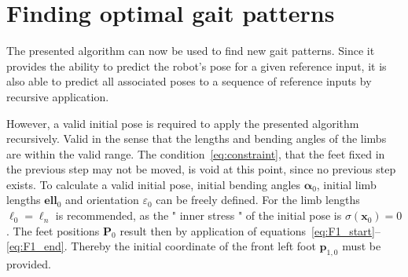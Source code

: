 \documentclass[10pt,a4paper]{article}
\begin{document}
\section{Finding optimal gait patterns}

%

The presented algorithm can now be used to find new gait patterns.
Since it provides the ability to predict the robot's pose for a given reference input, it is also able to predict all associated poses to a sequence of reference inputs by recursive application.


However, a valid initial pose is required to apply the presented algorithm recursively.
Valid in the sense that the lengths and bending angles of the limbs are within the valid range.
The condition~\eqref{eq:constraint}, that the feet fixed in the previous step may not be moved, is void at this point, since no previous step exists.
To calculate a valid initial pose, initial bending angles $\bm{\alpha}_0$, initial limb lengths $\bm{ell}_0$ and orientation $\varepsilon_0$ can be freely defined.
For the limb lengths $\bm{\ell}_0 = \bm{\ell}_n$ is recommended, as the " inner stress " of the initial pose is $\sigma(\bm{x}_0) = 0$.
The feet positions $\bm{P}_0$ result then by application of equations~\eqref{eq:F1_start}--\eqref{eq:F1_end}.
Thereby the initial coordinate of the front left foot $\bm{p}_{1,0}$ must be provided.
\end{document}
